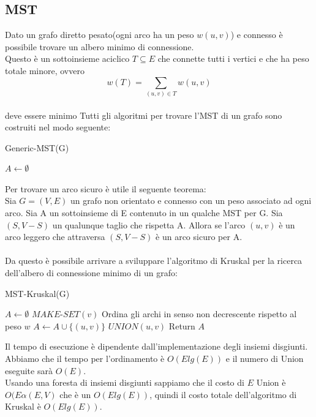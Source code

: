 \documentclass[]{article}
\begin{document}
\subsection{MST}
Dato un grafo diretto pesato(ogni arco ha un peso $w(u,v)$) e connesso è possibile trovare un albero minimo di connessione.\\
Questo è un sottoinsieme aciclico $T\subseteq E$ che connette tutti i vertici e che ha peso totale minore, ovvero\\
$$w(T) = \sum_{(u,v)\in T} w(u,v)$$ \\
deve essere minimo
\newpage
Tutti gli algoritmi per trovare l'MST di un grafo sono costruiti nel modo seguente:
\begin{algorithm}
\caption{Generic-MST(G)}
\begin{algorithmic}[1]
\STATE $A \leftarrow \emptyset$
\ENDWHILE
\end{algorithmic}
\end{algorithm}
Per trovare un arco sicuro è utile il seguente teorema:\\
Sia $G=(V,E)$ un grafo non orientato e connesso con un peso associato ad ogni arco. Sia A un sottoinsieme di E contenuto in un qualche MST per G. Sia $(S, V-S)$ un qualunque taglio che rispetta A. Allora se l'arco $(u,v)$ è un arco leggero che attraversa $(S, V-S)$ è un arco sicuro per A.\\\\
Da questo è possibile arrivare a sviluppare l'algoritmo di Kruskal per la ricerca dell'albero di connessione minimo di un grafo:
\begin{algorithm}
\caption{MST-Kruskal(G)}
\begin{algorithmic}[1]
\STATE $A \leftarrow \emptyset$
	\STATE $MAKE\mbox{-}SET(v)$
\ENDFOR 
\STATE Ordina gli archi in senso non decrescente rispetto al peso $w$
		\STATE $A \leftarrow A \cup \{(u,v)\}$
		\STATE $UNION(u,v)$	
	\ENDIF
\ENDFOR
\STATE Return $A$
\end{algorithmic}
\end{algorithm}
Il tempo di esecuzione è dipendente dall'implementazione degli insiemi disgiunti.\\
Abbiamo che il tempo per l'ordinamento è $O(Elg(E))$ e il numero di Union eseguite sarà $O(E)$.\\
Usando una foresta di insiemi disgiunti sappiamo che il costo di $E$ Union è $O(E\alpha(E,V)$ che è un $O(Elg(E))$, quindi il costo totale dell'algoritmo di Kruskal è $O(Elg(E))$.
\end{document}
